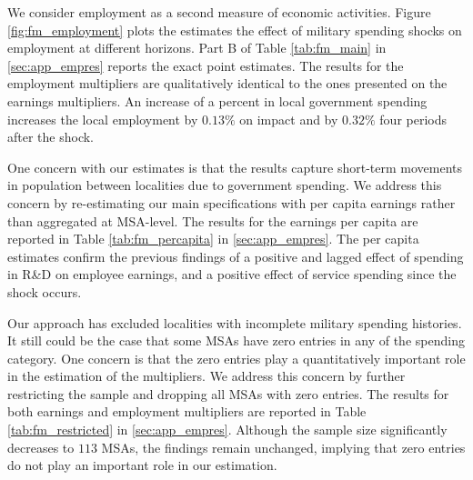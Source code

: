 \documentclass[dv_diss_main.tex]{subfiles}
\begin{document}
We consider employment as a second measure of economic activities. Figure \ref{fig:fm_employment} plots the estimates the effect of military spending shocks on employment at different horizons. Part B of Table \ref{tab:fm_main} in \ref{sec:app_empres} reports the exact point estimates. The results for the employment multipliers are qualitatively identical to the ones presented on the earnings multipliers. An increase of a percent in local government spending increases the local employment by $0.13\%$ on impact and by $0.32\%$ four periods after the shock.

One concern with our estimates is that the results capture short-term movements in population between localities due to government spending. We address this concern by re-estimating our main specifications with per capita earnings rather than aggregated at MSA-level. The results for the earnings per capita are reported in Table \ref{tab:fm_percapita} in \ref{sec:app_empres}. The per capita estimates confirm the previous findings of a positive and lagged effect of spending in R\&D on employee earnings, and a positive effect of service spending since the shock occurs.

Our approach has excluded localities with incomplete military spending histories. It still could be the case that some MSAs have zero entries in any of the spending category. One concern is that the zero entries play a quantitatively important role in the estimation of the multipliers. We address this concern by further restricting the sample and dropping all MSAs with zero entries. The results for both earnings and employment multipliers are reported in Table \ref{tab:fm_restricted} in \ref{sec:app_empres}. Although the sample size significantly decreases to $113$ MSAs, the findings remain unchanged, implying that zero entries do not play an important role in our estimation.

\iffalse
Another valid concern is the timing of actual spending. In the data, we observe the start and end date of the contract. In the regressions presented in sub-section \ref{subsec:emp_fm}, we use the year in which a contract has been signed to allocate the spending, and not the years in which the disbursements actually occur. To alleviate this source of spending mismeasurement, we follow \cite{Auerbach2020} and we construct a flow spending measure for each contract by allocating the value of a contract equally over its duration. The results for both the earnings and employment multipliers are reported in Table \ref{tab:fm_smooth} in \ref{sec:app_empres}. ???????????????
\fi
\end{document}
